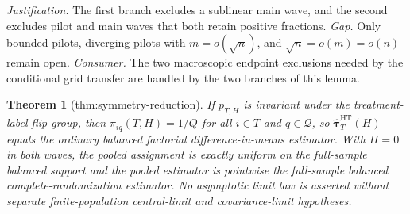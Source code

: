\documentclass{article}
\newtheorem{theorem}{Theorem}
\begin{document}
\par\smallskip\noindent \textit{Justification.} The first branch excludes a sublinear main wave, and the second excludes pilot and main waves that both retain positive fractions. \textit{Gap.} Only bounded pilots, diverging pilots with \(m=o(\sqrt n)\), and \(\sqrt n=o(m)=o(n)\) remain open. \textit{Consumer.} The two macroscopic endpoint exclusions needed by the conditional grid transfer are handled by the two branches of this lemma.

\begin{theorem}[thm:symmetry-reduction]\label{thm:symmetry-reduction}
If \(p_{T,H}\) is invariant under the treatment-label flip group, then \(\pi_{iq}(T,H)=1/Q\) for all \(i\in T\) and \(q\in\mathcal Q\), so \(\widehat{\boldsymbol\tau}^{\mathrm{HT}}_T(H)\) equals the ordinary balanced factorial difference-in-means estimator.  With \(H=0\) in both waves, the pooled assignment is exactly uniform on the full-sample balanced support and the pooled estimator is pointwise the full-sample balanced complete-randomization estimator.  No asymptotic limit law is asserted without separate finite-population central-limit and covariance-limit hypotheses.
\end{theorem}
\end{document}
